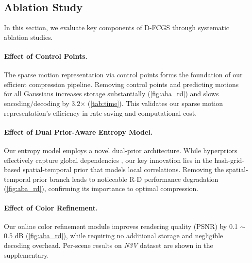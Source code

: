 \documentclass[letterpaper]{article} %
\begin{document}
\subsection{Ablation Study}
\label{sec:Q3}

In this section, we evaluate key components of D-FCGS through systematic ablation studies.



\paragraph{\textbf{Effect of Control Points.}} The sparse motion representation via control points forms the foundation of our efficient compression pipeline. Removing control points and predicting motions for all Gaussians increases storage substantially (\cref{fig:aba_rd}) and slows encoding/decoding by 3.2× (\cref{tab:time}). This validates our sparse motion representation's efficiency in rate saving and computational cost.


\paragraph{\textbf{Effect of Dual Prior-Aware Entropy Model.}} 
 Our entropy model employs a novel dual-prior architecture. While hyperpriors effectively capture global dependencies  \cite{balle2018variational}, our key innovation lies in the hash-grid-based spatial-temporal prior that models local correlations. Removing the spatial-temporal prior branch leads to noticeable R-D performance degradation (\cref{fig:aba_rd}), confirming its importance to optimal compression.



\paragraph{\textbf{Effect of Color Refinement.}} 

Our online color refinement module improves rendering quality (PSNR) by  0.1 $\sim$ 0.5 dB (\cref{fig:aba_rd}), while requiring no additional storage and  negligible decoding overhead. Per-scene results on \textit{N3V} dataset are shown in the supplementary.


\end{document}
